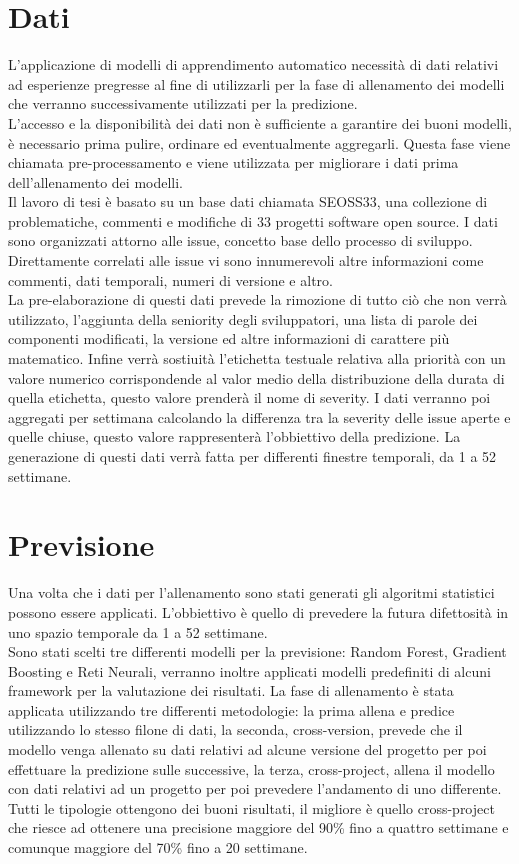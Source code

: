 \documentclass{article}
\begin{document}
\section{Dati}
L'applicazione di modelli di apprendimento automatico necessità di dati relativi ad esperienze pregresse al fine di utilizzarli per la fase di allenamento dei modelli che verranno successivamente utilizzati per la predizione.\\
L'accesso e la disponibilità dei dati non è sufficiente a garantire dei buoni modelli, è necessario prima pulire, ordinare ed eventualmente aggregarli. Questa fase viene chiamata pre-processamento e viene utilizzata per migliorare i dati prima dell'allenamento dei modelli.\\
Il lavoro di tesi è basato su un base dati chiamata SEOSS33, una collezione di problematiche, commenti e modifiche di 33 progetti software open source. I dati sono organizzati attorno alle issue, concetto base dello processo di sviluppo. Direttamente correlati alle issue vi sono innumerevoli altre informazioni come commenti, dati temporali, numeri di versione e altro.\\
La pre-elaborazione di questi dati prevede la rimozione di tutto ciò che non verrà utilizzato, l'aggiunta della seniority degli sviluppatori, una lista di parole dei componenti modificati, la versione ed altre informazioni di carattere più matematico. Infine verrà sostiuità l'etichetta testuale relativa alla priorità con un valore numerico corrispondende al valor medio della distribuzione della durata di quella etichetta, questo valore prenderà il nome di severity. I dati verranno poi aggregati per settimana calcolando la differenza tra la severity delle issue aperte e quelle chiuse, questo valore rappresenterà l'obbiettivo della predizione. La generazione di questi dati verrà fatta per differenti finestre temporali, da 1 a 52 settimane.

\section{Previsione}
Una volta che i dati per l'allenamento sono stati generati gli algoritmi statistici possono essere applicati. L'obbiettivo è quello di prevedere la futura difettosità in uno spazio temporale da 1 a 52 settimane.\\
Sono stati scelti tre differenti modelli per la previsione: Random Forest, Gradient Boosting e Reti Neurali, verranno inoltre applicati modelli predefiniti di alcuni framework per la valutazione dei risultati. La fase di allenamento è stata applicata utilizzando tre differenti metodologie: la prima allena e predice utilizzando lo stesso filone di dati, la seconda, cross-version, prevede che il modello venga allenato su dati relativi ad alcune versione del progetto per poi effettuare la predizione sulle successive, la terza, cross-project, allena il modello con dati relativi ad un progetto per poi prevedere l'andamento di uno differente.\\
Tutti le tipologie ottengono dei buoni risultati, il migliore è quello cross-project che riesce ad ottenere una precisione maggiore del 90\% fino a quattro settimane e comunque maggiore del 70\% fino a 20 settimane. 
\end{document}

